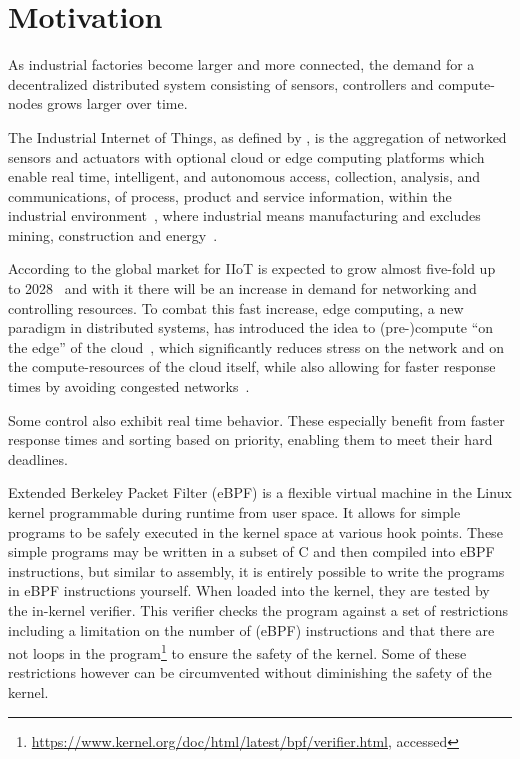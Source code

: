 \section{Motivation}


As industrial factories become larger and more connected, the demand for a
decentralized distributed system consisting of sensors, controllers and
compute-nodes grows larger over time.

The Industrial Internet of Things, as defined by
\citeauthor{boyes_industrial_2018}, is the aggregation of networked sensors and
actuators with optional cloud or edge computing platforms which enable real
time, intelligent, and autonomous access, collection, analysis, and
communications, of process, product and service information, within the
industrial environment~\cite{boyes_industrial_2018}, where industrial means
manufacturing and excludes mining, construction and
energy~\cite{noauthor_industry_nodate}.

According to \citeauthor{placek_industrial_nodate} the global market for IIoT is
expected to grow almost five-fold up to 2028~\cite{placek_industrial_nodate}
and with it there will be an increase in demand for networking and controlling
resources. To combat this fast increase, edge computing, a new paradigm in
distributed systems, has introduced the idea to (pre-)compute \enquote{on the
edge} of the cloud~\cite{shi_edge_2016}, which significantly reduces stress on
the network and on the compute-resources of the cloud itself, while also
allowing for faster response times by avoiding congested
networks~\cite{shi_edge_2016}.

Some control also exhibit real time behavior. These especially benefit from
faster response times and sorting based on priority, enabling them to meet their
hard deadlines.

Extended Berkeley Packet Filter (eBPF) is a flexible virtual machine in the
Linux kernel programmable during runtime from user space. It allows for simple
programs to be safely executed in the kernel space at various hook points. These
simple programs may be written in a subset of C and then compiled into eBPF
instructions, but similar to assembly, it is entirely possible to write the
programs in eBPF instructions yourself. When loaded into the kernel, they are
tested by the in-kernel verifier. This verifier checks the program against a set
of restrictions including a limitation on the number of (eBPF) instructions and
that there are not loops in the
program\footnote{\url{https://www.kernel.org/doc/html/latest/bpf/verifier.html},
accessed } to
ensure the safety of the kernel. Some of these restrictions however can be
circumvented without diminishing the safety of the kernel.



